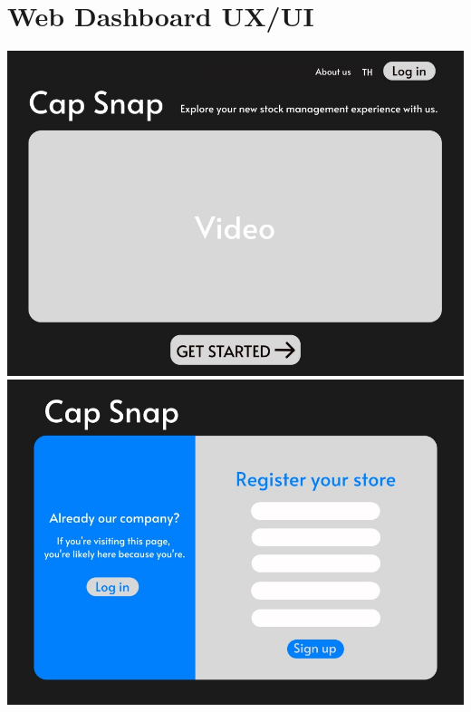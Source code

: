     \section{Web Dashboard UX/UI}
{
\includegraphics[scale=0.9]{pic/ui/1.jpg}
\includegraphics[scale=0.9]{pic/ui/2.jpg}
}\\
